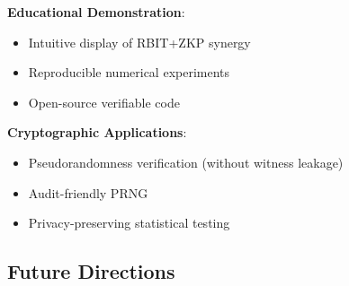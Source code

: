 \documentclass[12pt]{article}
\theoremstyle{plain}
\theoremstyle{definition}
\begin{document}
\textbf{Educational Demonstration}:
\begin{itemize}
\item Intuitive display of RBIT+ZKP synergy
\item Reproducible numerical experiments
\item Open-source verifiable code
\end{itemize}

\textbf{Cryptographic Applications}:
\begin{itemize}
\item Pseudorandomness verification (without witness leakage)
\item Audit-friendly PRNG
\item Privacy-preserving statistical testing
\end{itemize}

\subsection{Future Directions}
\end{document}

